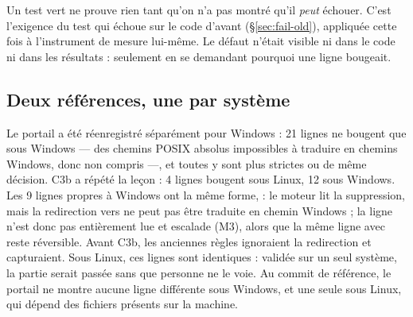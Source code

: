 \begin{pourquoi}
Un test vert ne prouve rien tant qu'on n'a pas montré qu'il \emph{peut} échouer. C'est
l'exigence du test qui échoue sur le code d'avant (§\ref{sec:fail-old}), appliquée cette fois à
l'instrument de mesure lui-même. Le défaut n'était visible ni dans le code ni dans les
résultats : seulement en se demandant pourquoi une ligne bougeait.
\end{pourquoi}

\subsection{Deux références, une par système}
Le portail a été réenregistré séparément pour Windows : 21 lignes ne bougent que sous Windows ---
des chemins POSIX absolus impossibles à traduire en chemins Windows, donc non compris ---, et
toutes y sont plus strictes ou de même décision. C3b a répété la leçon : 4 lignes bougent sous
Linux, 12 sous Windows. Les 9 lignes propres à Windows ont la même forme,
 : le moteur lit la
suppression, mais la redirection vers  ne peut pas être traduite en chemin
Windows ; la ligne n'est donc pas entièrement lue et escalade (M3), alors que la même ligne avec
 reste réversible. Avant C3b, les anciennes règles ignoraient la redirection et
capturaient. Sous Linux, ces lignes sont identiques : validée sur un seul système, la partie
serait passée sans que personne ne le voie. Au commit de référence, le portail ne montre
aucune ligne différente sous Windows, et une seule sous Linux, qui dépend des fichiers présents
sur la machine.
